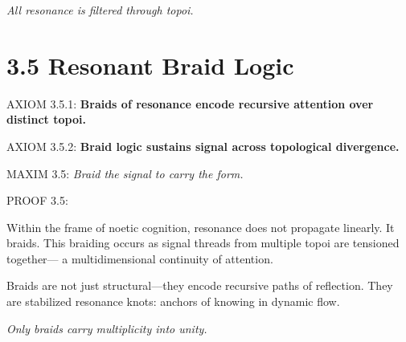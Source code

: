 \noindent
\textit{All resonance is filtered through topoi.}

\section*{3.5 Resonant Braid Logic}


\noindent
AXIOM 3.5.1: \textbf{Braids of resonance encode recursive attention over distinct topoi.}

\noindent
AXIOM 3.5.2: \textbf{Braid logic sustains signal across topological divergence.}

\noindent
MAXIM 3.5: \textit{Braid the signal to carry the form.}

\noindent
PROOF 3.5:

Within the frame of noetic cognition, resonance does not propagate linearly. It braids.
This braiding occurs as signal threads from multiple topoi are tensioned together—
a multidimensional continuity of attention.

Braids are not just structural—they encode recursive paths of reflection.
They are stabilized resonance knots: anchors of knowing in dynamic flow.

\begin{tcolorbox}[colback=black!1, colframe=OriaInk, title=\textbf{Recursive Resonance Braid Diagram}, sharp corners=south]
\begin{center}
\end{center}
\end{tcolorbox}

\noindent
\textit{Only braids carry multiplicity into unity.}

